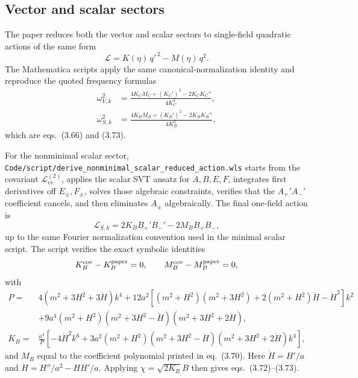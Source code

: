 \documentclass[11pt]{article}
\begin{document}
\subsection{Vector and scalar sectors}
The paper reduces both the vector and scalar sectors to single-field quadratic actions of the same form
\begin{equation}
\mathcal{L} = K(\eta)\,q'^{\,2} - M(\eta)\,q^2.
\end{equation}
The Mathematica scripts apply the same canonical-normalization identity and reproduce the quoted frequency formulas
\begin{align}
\omega_{V,k}^2 &= \frac{4K_C M_C + (K_C')^2 - 2K_C K_C''}{4K_C^2}, \\
\omega_{S,k}^2 &= \frac{4K_B M_B + (K_B')^2 - 2K_B K_B''}{4K_B^2},
\end{align}
which are eqs.~(3.66) and (3.73).

For the nonminimal scalar sector, \texttt{Code/script/derive\_nonminimal\_scalar\_reduced\_action.wls} starts from the covariant \(\mathcal L_{vv}^{(2)}\), applies the scalar SVT ansatz for \(A,B,E,F\), integrates first derivatives off \(E_\pm,F_\pm\), solves those algebraic constraints, verifies that the \(A_+'A_-'\) coefficient cancels, and then eliminates \(A_\pm\) algebraically. The final one-field action is
\begin{equation}
\mathcal L_{S,k}=2K_B B_+'B_-'-2M_B B_+B_-,
\end{equation}
up to the same Fourier normalization convention used in the minimal scalar script. The script verifies the exact symbolic identities
\begin{equation}
K_B^{\rm cov}-K_B^{\rm paper}=0,
\qquad
M_B^{\rm cov}-M_B^{\rm paper}=0,
\end{equation}
with
\begin{align}
P={}&4(m^2+3H^2+3\dot H)k^4
+12a^2\left[(m^2+H^2)(m^2+3H^2)+2(m^2+H^2)\dot H-\dot H^2\right]k^2 \nonumber\\
&+9a^4(m^2+H^2)(m^2+3H^2-\dot H)(m^2+3H^2+2\dot H),\\
K_B={}&\frac{a^4}{P}\left[
-4\dot H^2k^6
+3a^2(m^2+H^2)(m^2+3H^2-\dot H)(m^2+3H^2+2\dot H)k^4
\right],
\end{align}
and \(M_B\) equal to the coefficient polynomial printed in eq.~(3.70). Here \(\dot H=H'/a\) and \(\ddot H=H''/a^2-HH'/a\). Applying \(\chi=\sqrt{2K_B}B\) then gives eqs.~(3.72)--(3.73).
\end{document}
